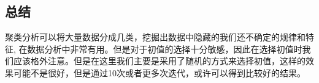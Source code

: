 \documentclass[a4paper, 1pt]{article}
\newcommand{\xiaosihao}{\fontsize{12pt}{\baselineskip}\selectfont}
\begin{document}
\begin{spacing}{1.0}
\section{\xiaosihao 总结}
聚类分析可以将大量数据分成几类，挖掘出数据中隐藏的我们还不确定的规律和特征, 在数据分析中非常有用。但是对于初值的选择十分敏感，因此在选择初值时我们应该格外注意。但是在这里我们主要是采用了随机的方式来选择初值，这样的效果可能不是很好，但是通过10次或者更多次迭代，或许可以得到比较好的结果。
\end{spacing}
\end{document}
